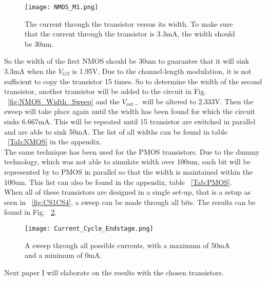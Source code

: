 \begin{figure}
\begin{center}
\texttt{[image: NMOS\_M1.png]}
\caption{The current through the transistor versus its width. To make sure that the current through the transistor is 3.3mA, the width should be 30um.}
\label{fig:NMOS_Width_Sweep_Result}
\end{center}
\end{figure}

So the width of the first NMOS should be 30um to guarantee that it will sink 3.3mA when the $V_{GS}$ is 1.95V. Due to the channel-length modulation, it is not sufficient to copy the transistor 15 times. So to determine the width of the second transistor, another transistor will be added to the circuit in Fig. ~\ref{fig:NMOS_Width_Sweep} and the $V_{out-}$ will be altered to 2.333V. Then the sweep will take place again until the width has been found for which the circuit sinks 6.667mA. This will be repeated until 15 transistor are switched in parallel and are able to sink 50mA. The list of all widths can be found in table ~\ref{Tab:NMOS} in the appendix.\\
The same technique has been used for the PMOS transistors. Due to the dummy technology, which was not able to simulate width over 100um, each bit will be represented by to PMOS in parallel so that the width is maintained within the 100um. This list can also be found in the appendix, table ~\ref{Tab:PMOS}.\\

When all of these transistors are designed in a single set-up, that is a setup as seen in ~\ref{fig:CS1CS4}, a sweep can be made through all bits. The results can be found in Fig. ~\ref{fig:Final_result}.
\begin{figure}[ht!]
\begin{center}
\texttt{[image: Current\_Cycle\_Endstage.png]}
\caption{A sweep through all possible currents, with a maximum of 50mA and a minimum of 0mA.}
\label{fig:Final_result}
\end{center}
\end{figure}

Next paper I will elaborate on the results with the chosen transistors. 